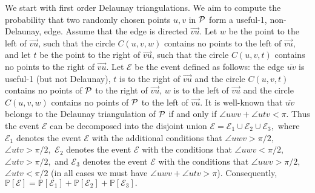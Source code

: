 \documentclass {journal}
\newcommand{\Pts}{\cal P}
\newcommand {\fodts}{first order Delaunay triangulations}
\newcommand{\bP}{{\mathbb P}}
\begin{document}
We start with \fodts. We aim to compute the probability that two
randomly chosen points $u, v$ in $\Pts$ form a useful-1,
non-Delaunay, edge. Assume that the edge is directed
$\overrightarrow{vu}$. Let $w$ be the point to the left of
$\overrightarrow{vu}$, such that the circle $C(u,v,w)$ contains no
points to the left of $\overrightarrow{vu}$, and let $t$ be the
point to the right of $\overrightarrow{vu}$, such that the circle
$C(u,v,t)$ contains no points to the right of
$\overrightarrow{vu}$. Let $\mathcal{E}$ be the event defined as
follows: the edge $\overline{uv}$ is useful-1 (but not Delaunay),
$t$ is to the right of $\overrightarrow{vu}$ and the circle
$C(u,v,t)$ contains no points of $\Pts$ to the right of
$\overrightarrow{vu}$, $w$ is to the left of $\overrightarrow{vu}$
and the circle $C(u,v,w)$ contains no points of $\Pts$ to the left
of $\overrightarrow{vu}$. It is well-known that $\overline{uv}$
belongs to the Delaunay triangulation of $\Pts$ if and only if
$\angle uwv+\angle utv < \pi$. Thus the event $\mathcal{E}$ can be
decomposed into the disjoint union
$\mathcal{E}=\mathcal{E}_1\cup\mathcal{E}_2\cup\mathcal{E}_3,$
where $\mathcal{E}_1$ denotes the event $\mathcal{E}$ with the
additional conditions that $\angle uwv > \pi/2,$ $\angle utv >
\pi/2,$ $\mathcal{E}_2$ denotes the event $\mathcal{E}$ with the
 conditions that $\angle uwv< \pi/2,$ $\angle utv >
\pi/2,$ and $\mathcal{E}_3$ denotes the event $\mathcal{E}$ with
the  conditions that $\angle uwv> \pi/2,$ $\angle utv <
\pi/2$ (in all cases we must have $\angle uwv+\angle utv
>\pi$).  Consequently,
$\bP[\mathcal{E}]=\bP[\mathcal{E}_1]+\bP[\mathcal{E}_2]+\bP[\mathcal{E}_3].$
\end{document}
